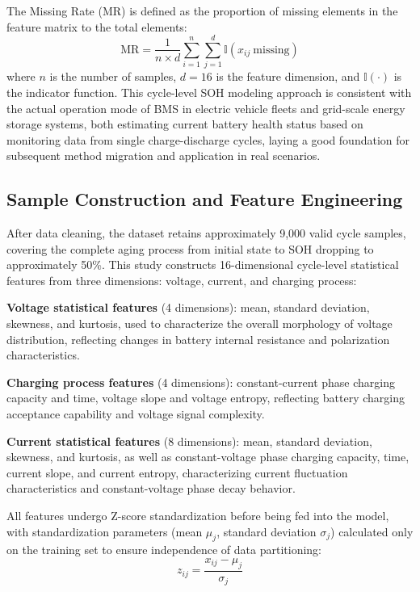 \documentclass[5p,times]{elsarticle}
\begin{document}
The Missing Rate (MR) is defined as the proportion of missing elements in the feature matrix to the total elements:
\begin{equation}
    \text{MR} = \frac{1}{n \times d} \sum_{i=1}^{n}\sum_{j=1}^{d} \mathbb{I}(x_{ij}\ \text{missing})
    \label{eq:mr}
\end{equation}
where $n$ is the number of samples, $d=16$ is the feature dimension, and $\mathbb{I}(\cdot)$ is the indicator function. This cycle-level SOH modeling approach is consistent with the actual operation mode of BMS in electric vehicle fleets and grid-scale energy storage systems, both estimating current battery health status based on monitoring data from single charge-discharge cycles, laying a good foundation for subsequent method migration and application in real scenarios.

\subsection{Sample Construction and Feature Engineering}

After data cleaning, the dataset retains approximately 9,000 valid cycle samples, covering the complete aging process from initial state to SOH dropping to approximately 50\%. This study constructs 16-dimensional cycle-level statistical features from three dimensions: voltage, current, and charging process:

\textbf{Voltage statistical features} (4 dimensions): mean, standard deviation, skewness, and kurtosis, used to characterize the overall morphology of voltage distribution, reflecting changes in battery internal resistance and polarization characteristics.

\textbf{Charging process features} (4 dimensions): constant-current phase charging capacity and time, voltage slope and voltage entropy, reflecting battery charging acceptance capability and voltage signal complexity.

\textbf{Current statistical features} (8 dimensions): mean, standard deviation, skewness, and kurtosis, as well as constant-voltage phase charging capacity, time, current slope, and current entropy, characterizing current fluctuation characteristics and constant-voltage phase decay behavior.

All features undergo Z-score standardization before being fed into the model, with standardization parameters (mean $\mu_j$, standard deviation $\sigma_j$) calculated only on the training set to ensure independence of data partitioning:
\begin{equation}
    z_{ij} = \frac{x_{ij} - \mu_j}{\sigma_j}
\end{equation}
\end{document}
